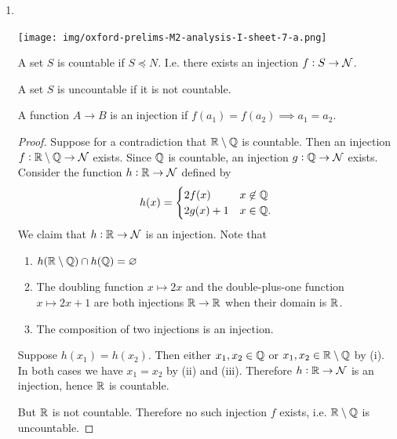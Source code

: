 \begin{enumerate}
  \newpage
\item~\\
  \begin{mdframed}
    \texttt{[image: img/oxford-prelims-M2-analysis-I-sheet-7-a.png]}
  \end{mdframed}
  \begin{definition*}[Countable]
    A set $S$ is countable if $S \preceq N$. I.e. there exists an injection $f:S \to \mathcal{N}$.
  \end{definition*}
  \begin{definition*}[Uncountable]
    A set $S$ is uncountable if it is not countable.
  \end{definition*}
  \begin{definition*}[Injection]
    A function $A \to B$ is an injection if $f(a_1) = f(a_2) \implies a_1 = a_2$.
  \end{definition*}
  \begin{proof}
    Suppose for a contradiction that $\mathbb{R} \setminus \mathbb{Q}$ is countable. Then an injection
    $f:\mathbb{R} \setminus \mathbb{Q} \to \mathcal{N}$ exists. Since $\mathbb{Q}$ is countable, an injection $g:\mathbb{Q} \to \mathcal{N}$
    exists. Consider the function $h:\mathbb{R} \to \mathcal{N}$ defined by
    \begin{align*}
      h(x) =
      \begin{cases}
        2f(x) &x \not\in\mathbb{Q}\\
        2g(x) + 1 &x \in \mathbb{Q}.
      \end{cases}
    \end{align*}
    We claim that $h:\mathbb{R} \to \mathcal{N}$ is an injection. Note that
    \begin{enumerate}[label=(\roman*)]
    \item $h(\mathbb{R}\setminus\mathbb{Q}) \cap h(\mathbb{Q}) = \varnothing$
    \item The doubling function $x \mapsto 2x$ and the double-plus-one function $x \mapsto 2x + 1$
      are both injections $\mathbb{R} \to \mathbb{R}$ when their domain is $\mathbb{R}$.
    \item The composition of two injections is an injection.
    \end{enumerate}
    Suppose $h(x_1) = h(x_2)$. Then either $x_1, x_2 \in \mathbb{Q}$ or $x_1, x_2 \in \mathbb{R}\setminus\mathbb{Q}$ by
    (i). In both cases we have $x_1 = x_2$ by (ii) and (iii). Therefore $h:\mathbb{R} \to \mathcal{N}$ is an
    injection, hence $\mathbb{R}$ is countable.

    But $\mathbb{R}$ is not countable. Therefore no such injection $f$ exists, i.e. $\mathbb{R}\setminus\mathbb{Q}$ is
    uncountable.
  \end{proof}


\end{enumerate}

